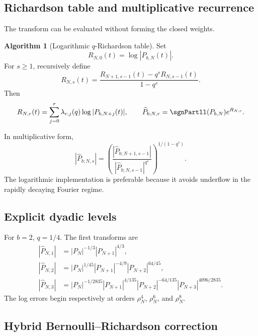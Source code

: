 \documentclass[11pt]{article}
\numberwithin{equation}{section}
\theoremstyle{definition}
\newtheorem{algorithm}[theorem]{Algorithm}
\theoremstyle{remark}
\begin{document}
\subsection{Richardson table and multiplicative recurrence}

The transform can be evaluated without forming the closed weights.

\begin{algorithm}[Logarithmic $q$-Richardson table]
\label{p8:alg:rich-table}
Set
\[
R_{N,0}(t)=\log|P_{b,N}(t)|.
\]
For $s\ge1$, recursively define
\begin{equation}
R_{N,s}(t)=
\frac{R_{N+1,s-1}(t)-q^sR_{N,s-1}(t)}{1-q^s}.
\label{p8:eq:rich-recursion}
\end{equation}
Then
\begin{equation}
R_{N,r}(t)=\sum_{j=0}^{r}\lambda_{r,j}(q)
\log|P_{b,N+j}(t)|,
\qquad
\widehat P_{b;N,r}=\sgnPartll(P_{b,N})e^{R_{N,r}}.
\label{p8:eq:rich-table-result}
\end{equation}
\end{algorithm}

In multiplicative form,
\begin{equation}
|\widehat P_{b;N,s}|
=\left(
\frac{|\widehat P_{b;N+1,s-1}|}
{|\widehat P_{b;N,s-1}|^{q^s}}
\right)^{1/(1-q^s)}.
\label{p8:eq:multiplicative-recursion}
\end{equation}
The logarithmic implementation is preferable because it avoids underflow in the rapidly decaying Fourier regime.

\subsection{Explicit dyadic levels}

For $b=2$, $q=1/4$. The first transforms are
\begin{align}
|\widehat P_{N,1}|
&=|P_N|^{-1/3}|P_{N+1}|^{4/3},
\label{p8:eq:r1-dyadic}\\
|\widehat P_{N,2}|
&=|P_N|^{1/45}|P_{N+1}|^{-4/9}|P_{N+2}|^{64/45},
\label{p8:eq:r2-dyadic}\\
|\widehat P_{N,3}|
&=|P_N|^{-1/2835}|P_{N+1}|^{4/135}
|P_{N+2}|^{-64/135}|P_{N+3}|^{4096/2835}.
\label{p8:eq:r3-dyadic}
\end{align}
The log errors begin respectively at orders $\rho_N^4$, $\rho_N^6$, and $\rho_N^8$.

\subsection{Hybrid Bernoulli--Richardson correction}
\end{document}
